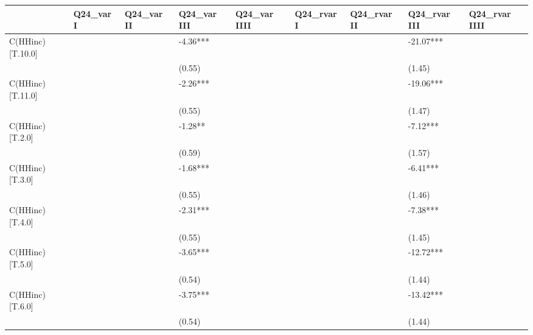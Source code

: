 \documentclass{report}
\begin{document}
\begin{table}\begin{tabular}{lllllllll}
\toprule
{} & Q24\_var I & Q24\_var II & Q24\_var III & Q24\_var IIII & Q24\_rvar I & Q24\_rvar II & Q24\_rvar III & Q24\_rvar IIII \\
\midrule
C(HHinc)[T.10.0]   &           &            &    -4.36*** &              &            &             &    -21.07*** &               \\
                   &           &            &      (0.55) &              &            &             &       (1.45) &               \\
C(HHinc)[T.11.0]   &           &            &    -2.26*** &              &            &             &    -19.06*** &               \\
                   &           &            &      (0.55) &              &            &             &       (1.47) &               \\
C(HHinc)[T.2.0]    &           &            &     -1.28** &              &            &             &     -7.12*** &               \\
                   &           &            &      (0.59) &              &            &             &       (1.57) &               \\
C(HHinc)[T.3.0]    &           &            &    -1.68*** &              &            &             &     -6.41*** &               \\
                   &           &            &      (0.55) &              &            &             &       (1.46) &               \\
C(HHinc)[T.4.0]    &           &            &    -2.31*** &              &            &             &     -7.38*** &               \\
                   &           &            &      (0.55) &              &            &             &       (1.45) &               \\
C(HHinc)[T.5.0]    &           &            &    -3.65*** &              &            &             &    -12.72*** &               \\
                   &           &            &      (0.54) &              &            &             &       (1.44) &               \\
C(HHinc)[T.6.0]    &           &            &    -3.75*** &              &            &             &    -13.42*** &               \\
                   &           &            &      (0.54) &              &            &             &       (1.44) &               \\

\end{tabular}
\end{table}
\end{document}
